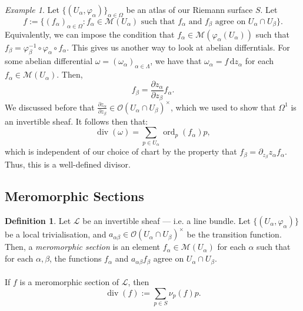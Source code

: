 \documentclass[a4paper]{report}
\theoremstyle{definition}
\newtheorem{definition}{Definition}
\theoremstyle{remark}
\theoremstyle{proposition}
\theoremstyle{conjecture}
\theoremstyle{lemma}
\theoremstyle{corollary}
\theoremstyle{exercise}
\theoremstyle{example}
\newtheorem{example}{Example}
\newcommand{\mcal}{\mathcal}
\newcommand{\diff}{\,\mathrm{d}}
\newcommand{\on}{\operatorname}
\begin{document}
\begin{example}
    Let $\lbrace (U_\alpha,\varphi_\alpha)\rbrace_{\alpha\in\Omega}$ be an atlas of 
    our Riemann surface $S$. Let
    $$f:= \lbrace (f_\alpha)_{\alpha\in\Omega} : \text{$f_\alpha\in\mcal{M}(U_\alpha)$ such that $f_\alpha$ and $f_\beta$ agree on $U_\alpha\cap U_\beta$}\rbrace.$$
    Equivalently, we can impose the condition that 
    $f_\alpha \in \mcal{M}(\varphi_\alpha(U_\alpha))$ such that 
    $f_\beta = \varphi_\beta^{-1}\circ \varphi_\alpha\circ f_\alpha$.
    This gives us another way to look at abelian differntials.
    For some abelian differential $\omega = (\omega_\alpha)_{\alpha\in\Lambda}$,
    we have that $\omega_\alpha = f\diff z_\alpha$ for each 
    $f_\alpha\in\mcal{M}(U_\alpha)$. Then, 
    $$f_\beta = \frac{\partial z_\alpha}{\partial z_\beta} f_\alpha.$$
    We discussed before that $\frac{\partial z_\alpha}{\partial z_\beta} \in \mcal{O}(U_\alpha\cap U_\beta)^\times$, which we used to show that 
    $\Omega^1$ is an invertible sheaf.
    It follows then that:
    $$\on{div}(\omega) = \sum_{p\in U_\alpha} \on{ord}_p(f_\alpha)p,$$
    which is independent of our choice of chart by the property that 
    $f_\beta = \partial_{z_\beta}z_\alpha f_\alpha$. Thus, this is a well-defined
    divisor.
\end{example}

\subsection{Meromorphic Sections}

\begin{definition}
    Let $\mcal{L}$ be an invertible sheaf --- i.e. a line bundle.
    Let $\lbrace (U_\alpha,\varphi_\alpha)\rbrace$ be a local 
    trivialisation, and $a_{\alpha\beta} \in \mcal{O}(U_\alpha\cap U_\beta)^\times$
    be the transition function.
    Then, a \emph{meromorphic section} is an element $f_\alpha \in \mcal{M}(U_\alpha)$ for each $\alpha$ such that for each $\alpha,\beta$, the functions 
    $f_\alpha$ and $a_{\alpha\beta}f_\beta$ agree on $U_\alpha\cap U_\beta$.\\\\
    If $f$ is a meromorphic section of $\mcal{L}$, then 
    $$\on{div}(f) := \sum_{p\in S} \nu_p(f)p.$$
\end{definition}
\end{document}
